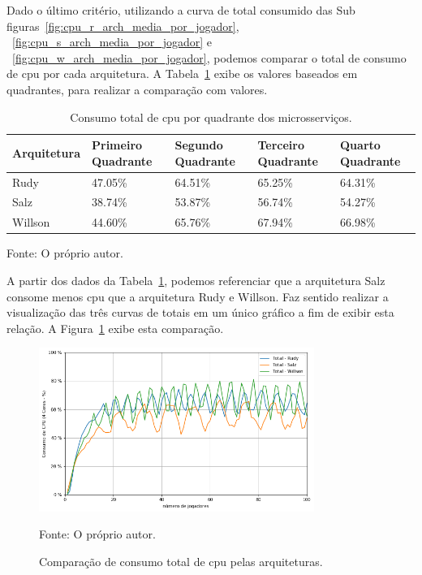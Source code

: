 Dado o último critério, utilizando a curva de total consumido das Sub figuras~\ref{fig:cpu_r_arch_media_por_jogador}, ~\ref{fig:cpu_s_arch_media_por_jogador} e ~\ref{fig:cpu_w_arch_media_por_jogador},  podemos comparar o total de consumo de \ac{cpu} por cada arquitetura.
%
A Tabela~\ref{tab:consumo_total_cpu} exibe os valores baseados em quadrantes, para realizar a comparação com valores.


\begin{table}[htb!]
\centering
\begin{adjustbox}{max width=\textwidth}
\caption{Consumo total de \ac{cpu} por quadrante dos microsserviços.}
\label{tab:consumo_total_cpu}

\begin{tabular}{|l|l|l|l|l|}
\hline
Arquitetura & Primeiro Quadrante & Segundo Quadrante & Terceiro Quadrante & Quarto Quadrante \\ \hline
Rudy        & 47.05\%            & 64.51\%           & 65.25\%            & 64.31\%          \\ \hline
Salz        & 38.74\%            & 53.87\%           & 56.74\%            & 54.27\%          \\ \hline
Willson     & 44.60\%            & 65.76\%           & 67.94\%            & 66.98\%          \\ \hline
\end{tabular}
\end{adjustbox}

Fonte: O próprio autor.
\end{table}

A partir dos dados da Tabela~\ref{tab:consumo_total_cpu}, podemos referenciar que a arquitetura Salz consome menos \ac{cpu} que a arquitetura Rudy e Willson.
%
Faz sentido realizar a visualização das três curvas de totais em um único gráfico a fim de exibir esta relação.
%
A Figura~\ref{fig:consumo_total_cpu} exibe esta comparação.

\begin{figure}[htb!]
  \caption{Comparação de consumo total de \ac{cpu} pelas arquiteturas.}
  \label{fig:consumo_total_cpu}
  \includegraphics[width=0.8\textwidth]{figuras/analise/cpu_total_archs.png}
  \centering

  Fonte: O próprio autor.
\end{figure}

